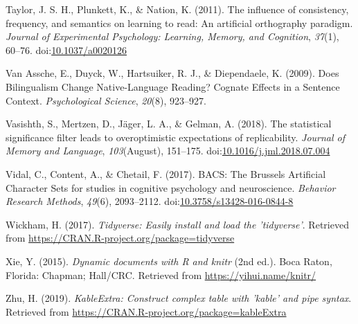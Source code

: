\documentclass[doc,floatsintext]{apa6}
\begin{document}
\hypertarget{ref-Taylor2011}{}
Taylor, J. S. H., Plunkett, K., \& Nation, K. (2011). The influence of
consistency, frequency, and semantics on learning to read: An artificial
orthography paradigm. \emph{Journal of Experimental Psychology:
Learning, Memory, and Cognition}, \emph{37}(1), 60--76.
doi:\href{https://doi.org/10.1037/a0020126}{10.1037/a0020126}

\hypertarget{ref-VanAssche2009}{}
Van Assche, E., Duyck, W., Hartsuiker, R. J., \& Diependaele, K. (2009).
Does Bilingualism Change Native-Language Reading? Cognate Effects in a
Sentence Context. \emph{Psychological Science}, \emph{20}(8), 923--927.

\hypertarget{ref-Vasishth2018}{}
Vasishth, S., Mertzen, D., Jäger, L. A., \& Gelman, A. (2018). The
statistical significance filter leads to overoptimistic expectations of
replicability. \emph{Journal of Memory and Language},
\emph{103}(August), 151--175.
doi:\href{https://doi.org/10.1016/j.jml.2018.07.004}{10.1016/j.jml.2018.07.004}

\hypertarget{ref-Vidal2017}{}
Vidal, C., Content, A., \& Chetail, F. (2017). BACS: The Brussels
Artificial Character Sets for studies in cognitive psychology and
neuroscience. \emph{Behavior Research Methods}, \emph{49}(6),
2093--2112.
doi:\href{https://doi.org/10.3758/s13428-016-0844-8}{10.3758/s13428-016-0844-8}

\hypertarget{ref-R-tidyverse}{}
Wickham, H. (2017). \emph{Tidyverse: Easily install and load the
'tidyverse'}. Retrieved from
\url{https://CRAN.R-project.org/package=tidyverse}

\hypertarget{ref-R-knitr}{}
Xie, Y. (2015). \emph{Dynamic documents with R and knitr} (2nd ed.).
Boca Raton, Florida: Chapman; Hall/CRC. Retrieved from
\url{https://yihui.name/knitr/}

\hypertarget{ref-R-kableExtra}{}
Zhu, H. (2019). \emph{KableExtra: Construct complex table with 'kable'
and pipe syntax}. Retrieved from
\url{https://CRAN.R-project.org/package=kableExtra}

\endgroup

\clearpage
\end{document}
